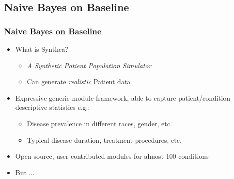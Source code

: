 \documentclass{beamer}
\begin{document}
\subsection{Naive Bayes on Baseline} %
\begin{frame}
\frametitle{Naive Bayes on Baseline}
\begin{itemize}
	\item What is Synthea?
	\begin{itemize}
			\item \textit{A Synthetic Patient Population Simulator}
			\item Can generate \textit{realistic} Patient data
	\end{itemize}
	\item Expressive generic module framework, able to capture patient/condition descriptive statistics e.g.:
		\begin{itemize}
			\item Disease prevalence in different races, gender, etc.
			\item Typical disease duration, treatment procedures, etc.
		\end{itemize}
	\item Open source, user contributed modules for almost 100 conditions
	\item But ...
\end{itemize}
\end{frame}
\end{document}
